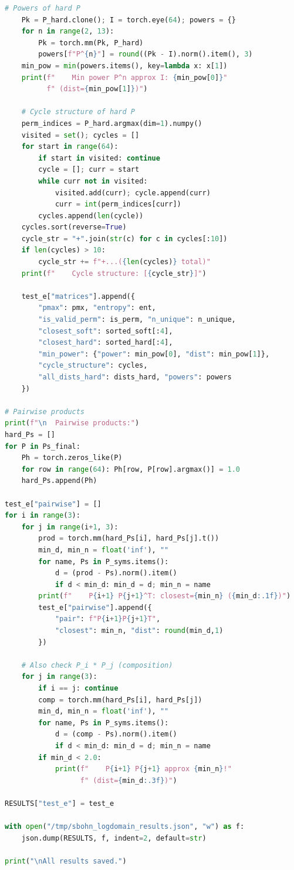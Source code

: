 \documentclass[11pt,a4paper]{report}
\begin{document}
\begin{lstlisting}[language=Python, caption={Log-Domain Sinkhorn --- Tests D--E (\texttt{sbohn\_logdomain\_test\_de.py})}]
    # Powers of hard P
    Pk = P_hard.clone(); I = torch.eye(64); powers = {}
    for n in range(2, 13):
        Pk = torch.mm(Pk, P_hard)
        powers[f"P^{n}"] = round((Pk - I).norm().item(), 3)
    min_pow = min(powers.items(), key=lambda x: x[1])
    print(f"    Min power P^n approx I: {min_pow[0]}"
          f" (dist={min_pow[1]})")
    
    # Cycle structure of hard P
    perm_indices = P_hard.argmax(dim=1).numpy()
    visited = set(); cycles = []
    for start in range(64):
        if start in visited: continue
        cycle = []; curr = start
        while curr not in visited:
            visited.add(curr); cycle.append(curr)
            curr = int(perm_indices[curr])
        cycles.append(len(cycle))
    cycles.sort(reverse=True)
    cycle_str = "+".join(str(c) for c in cycles[:10])
    if len(cycles) > 10:
        cycle_str += f"+...({len(cycles)} total)"
    print(f"    Cycle structure: [{cycle_str}]")
    
    test_e["matrices"].append({
        "pmax": pmx, "entropy": ent,
        "is_valid_perm": is_perm, "n_unique": n_unique,
        "closest_soft": sorted_soft[:4],
        "closest_hard": sorted_hard[:4],
        "min_power": {"power": min_pow[0], "dist": min_pow[1]},
        "cycle_structure": cycles,
        "all_dists_hard": dists_hard, "powers": powers
    })

# Pairwise products
print(f"\n  Pairwise products:")
hard_Ps = []
for P in Ps_final:
    Ph = torch.zeros_like(P)
    for row in range(64): Ph[row, P[row].argmax()] = 1.0
    hard_Ps.append(Ph)

test_e["pairwise"] = []
for i in range(3):
    for j in range(i+1, 3):
        prod = torch.mm(hard_Ps[i], hard_Ps[j].t())
        min_d, min_n = float('inf'), ""
        for name, Ps in P_syms.items():
            d = (prod - Ps).norm().item()
            if d < min_d: min_d = d; min_n = name
        print(f"    P{i+1} P{j+1}^T: closest={min_n} ({min_d:.1f})")
        test_e["pairwise"].append({
            "pair": f"P{i+1}P{j+1}T",
            "closest": min_n, "dist": round(min_d,1)
        })

    # Also check P_i * P_j (composition)
    for j in range(3):
        if i == j: continue
        comp = torch.mm(hard_Ps[i], hard_Ps[j])
        min_d, min_n = float('inf'), ""
        for name, Ps in P_syms.items():
            d = (comp - Ps).norm().item()
            if d < min_d: min_d = d; min_n = name
        if min_d < 2.0:
            print(f"    P{i+1} P{j+1} approx {min_n}!"
                  f" (dist={min_d:.3f})")

RESULTS["test_e"] = test_e

with open("/tmp/sbohn_logdomain_results.json", "w") as f:
    json.dump(RESULTS, f, indent=2, default=str)

print("\nAll results saved.")
\end{lstlisting}
\end{document}
